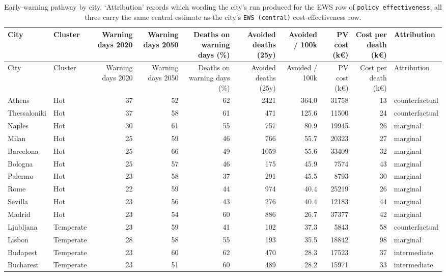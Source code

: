\begingroup\scriptsize
\begin{longtable}{llrrrrrrrl}
\caption{Early-warning pathway by city. `Attribution' records which wording the city's run produced for the EWS row of \texttt{policy\_effectiveness}; all three carry the same central estimate as the city's \texttt{EWS (central)} cost-effectiveness row.} \\ 
  \toprule
City & Cluster & Warning days 2020 & Warning days 2050 & Deaths on warning days (\%) & Avoided deaths (25y) & Avoided / 100k & PV cost (k€) & Cost per death (k€) & Attribution \\ 
  \midrule
\endfirsthead
  \toprule
City & Cluster & Warning days 2020 & Warning days 2050 & Deaths on warning days (\%) & Avoided deaths (25y) & Avoided / 100k & PV cost (k€) & Cost per death (k€) & Attribution \\ 
  \midrule
\endhead
Athens & Hot & 37 & 52 & 62 & 2421 & 364.0 & 31758 & 13 & counterfactual \\ 
  Thessaloniki & Hot & 37 & 58 & 61 & 471 & 125.6 & 11500 & 24 & counterfactual \\ 
  Naples & Hot & 30 & 61 & 55 & 757 & 80.9 & 19945 & 26 & marginal \\ 
  Milan & Hot & 25 & 59 & 46 & 766 & 55.7 & 20323 & 27 & marginal \\ 
  Barcelona & Hot & 25 & 66 & 49 & 1059 & 55.6 & 33409 & 32 & marginal \\ 
  Bologna & Hot & 25 & 57 & 46 & 175 & 45.9 & 7574 & 43 & marginal \\ 
  Palermo & Hot & 23 & 58 & 37 & 291 & 45.5 & 8793 & 30 & marginal \\ 
  Rome & Hot & 22 & 59 & 44 & 974 & 40.4 & 25219 & 26 & marginal \\ 
  Sevilla & Hot & 23 & 56 & 43 & 276 & 40.4 & 12183 & 44 & marginal \\ 
  Madrid & Hot & 23 & 54 & 60 & 886 & 26.7 & 37377 & 42 & marginal \\ 
  Ljubljana & Temperate & 23 & 59 & 41 & 102 & 37.3 & 5843 & 58 & counterfactual \\ 
  Lisbon & Temperate & 28 & 58 & 55 & 193 & 35.5 & 18842 & 98 & marginal \\ 
  Budapest & Temperate & 23 & 60 & 62 & 470 & 28.3 & 17523 & 37 & intermediate \\ 
  Bucharest & Temperate & 23 & 51 & 60 & 489 & 28.2 & 15971 & 33 & intermediate \\ 

\end{longtable}
